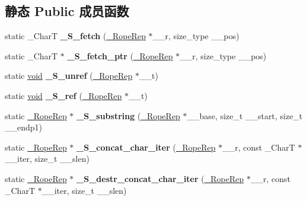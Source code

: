 \subsection*{静态 Public 成员函数}
\begin{DoxyCompactItemize}
\item 
\mbox{\label{classrope_a6b48e9df1f3914ee805e18291c9e50b6}} 
static \+\_\+\+CharT {\bfseries \+\_\+\+S\+\_\+fetch} (\hyperlink{struct___rope___rope_rep}{\+\_\+\+Rope\+Rep} $\ast$\+\_\+\+\_\+r, size\+\_\+type \+\_\+\+\_\+pos)
\item 
\mbox{\label{classrope_a5388be6602d0e9386405756e4c246f90}} 
static \+\_\+\+CharT $\ast$ {\bfseries \+\_\+\+S\+\_\+fetch\+\_\+ptr} (\hyperlink{struct___rope___rope_rep}{\+\_\+\+Rope\+Rep} $\ast$\+\_\+\+\_\+r, size\+\_\+type \+\_\+\+\_\+pos)
\item 
\mbox{\label{classrope_a26be680829e0d379cf373ccd518cce7d}} 
static \hyperlink{interfacevoid}{void} {\bfseries \+\_\+\+S\+\_\+unref} (\hyperlink{struct___rope___rope_rep}{\+\_\+\+Rope\+Rep} $\ast$\+\_\+\+\_\+t)
\item 
\mbox{\label{classrope_a5ce5636c4e46826f7e841e7fe848f12e}} 
static \hyperlink{interfacevoid}{void} {\bfseries \+\_\+\+S\+\_\+ref} (\hyperlink{struct___rope___rope_rep}{\+\_\+\+Rope\+Rep} $\ast$\+\_\+\+\_\+t)
\item 
\mbox{\label{classrope_a2ebfe4741c5946fa55ec6af707dac0dc}} 
static \hyperlink{struct___rope___rope_rep}{\+\_\+\+Rope\+Rep} $\ast$ {\bfseries \+\_\+\+S\+\_\+substring} (\hyperlink{struct___rope___rope_rep}{\+\_\+\+Rope\+Rep} $\ast$\+\_\+\+\_\+base, size\+\_\+t \+\_\+\+\_\+start, size\+\_\+t \+\_\+\+\_\+endp1)
\item 
\mbox{\label{classrope_a79da8dbd41d6d98bc398d02ea329eb65}} 
static \hyperlink{struct___rope___rope_rep}{\+\_\+\+Rope\+Rep} $\ast$ {\bfseries \+\_\+\+S\+\_\+concat\+\_\+char\+\_\+iter} (\hyperlink{struct___rope___rope_rep}{\+\_\+\+Rope\+Rep} $\ast$\+\_\+\+\_\+r, const \+\_\+\+CharT $\ast$\+\_\+\+\_\+iter, size\+\_\+t \+\_\+\+\_\+slen)
\item 
\mbox{\label{classrope_a709af04ae01be1401130b808eab350be}} 
static \hyperlink{struct___rope___rope_rep}{\+\_\+\+Rope\+Rep} $\ast$ {\bfseries \+\_\+\+S\+\_\+destr\+\_\+concat\+\_\+char\+\_\+iter} (\hyperlink{struct___rope___rope_rep}{\+\_\+\+Rope\+Rep} $\ast$\+\_\+\+\_\+r, const \+\_\+\+CharT $\ast$\+\_\+\+\_\+iter, size\+\_\+t \+\_\+\+\_\+slen)

\end{DoxyCompactItemize}
